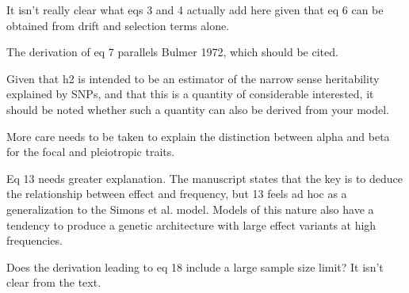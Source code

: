 \begin{point}{} %
It isn't really clear what eqs 3 and 4 actually add here given that eq 6 can be obtained from drift and selection terms alone.
\end{point}


\begin{point}{}
   The derivation of eq 7 parallels Bulmer 1972, which should be cited. 
\end{point}


\begin{point}{}
Given that h2 is intended to be an estimator of the narrow sense heritability explained by SNPs, and that this is a quantity of considerable interested, it should be noted whether such a quantity can also be derived from your model.
\end{point}



\begin{point}{}
More care needs to be taken to explain the distinction between alpha and beta for the focal and pleiotropic traits.

\end{point}


\begin{point}{}
Eq 13 needs greater explanation. The manuscript states that the key is to deduce the relationship between effect and frequency, but 13 feels ad hoc as a generalization to the Simons et al. model. Models of this nature also have a tendency to produce a genetic architecture with large effect variants at high frequencies.
\end{point}


\begin{point}{}
Does the derivation leading to eq 18 include a large sample size limit? It isn't clear from the text.

\end{point}

